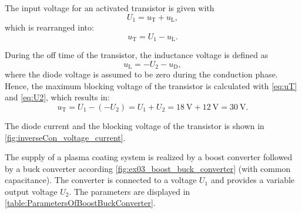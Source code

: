  \begin{solutionblock}
    The input voltage for an activated transistor is given with
    \begin{equation}
        U_1 = u_{\mathrm{T}} + u_{\mathrm{L}},
    \end{equation}
    which is rearranged into:
    \begin{equation}
        u_{\mathrm{T}} = U_1 - u_{\mathrm{L}}.
        \label{eq:uT}
    \end{equation}

    During the off time of the transistor, the inductance voltage is defined as
    \begin{equation}
        u_{\mathrm{L}} = -U_2 - u_{\mathrm{D}},
        \label{eq:U2}
    \end{equation}
    where the diode voltage is assumed to be zero during the conduction phase.
    Hence, the maximum blocking voltage of the transistor is calculated with \eqref{eq:uT} and \eqref{eq:U2}, which results in:
    \begin{equation}
        u_{\mathrm{T}} = U_1 - (-U_2)
        = U_1 + U_2 = \SI{18}{\volt} + \SI{12}{\volt} = \SI{30}{\volt}.
    \end{equation}

    The diode current and the blocking voltage of the transistor is shown in \autoref{fig:inverseCon_voltage_current}.
    
 \end{solutionblock}



The supply of a plasma coating system is realized by a boost converter followed by a buck converter according \autoref{fig:ex03_boost_buck_converter} (with common capacitance).
The converter is connected to a voltage $U_\mathrm{1}$ and provides a variable output voltage $U_\mathrm{2}$. The parameters are displayed in \autoref{table:ParametersOfBoostBuckConverter}.
\vspace{2em}\par

\par

\par


